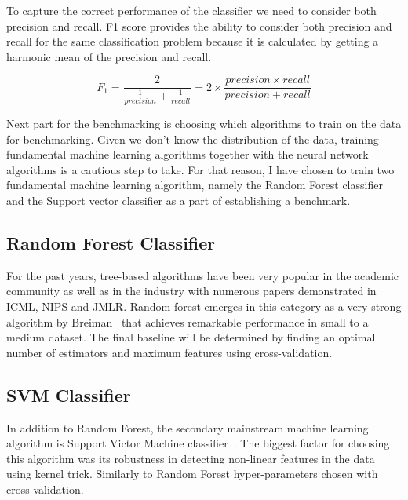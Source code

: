 To capture the correct performance of the classifier we need to consider both precision and recall.
F1 score provides the ability to consider both precision and recall for the same classification problem because it is calculated by getting a harmonic mean of the precision and recall.

\begin{equation}
    F_1 = \frac{2}{\frac{1}{precision} + \frac{1}{recall}} = 2 \times \frac{precision \times recall}{precision + recall}
\end{equation}


Next part for the benchmarking is choosing which algorithms to train on the data for benchmarking.
Given we don't know the distribution of the data, training fundamental machine learning algorithms together with the neural network algorithms is a cautious step to take. 
For that reason, I have chosen to train two fundamental machine learning algorithm, namely the Random Forest classifier and the Support vector classifier as a part of establishing a benchmark.


\subsection{Random Forest Classifier}
For the past years, tree-based algorithms have been very popular in the academic community as well as in the industry with numerous papers demonstrated in ICML, NIPS and JMLR.
Random forest emerges in this category as a very strong algorithm by Breiman~\cite{randomforest} that achieves remarkable performance in small to a medium dataset.
The final baseline will be determined by finding an optimal number of estimators and maximum features using cross-validation.


\subsection{SVM Classifier}
In addition to Random Forest, the secondary mainstream machine learning algorithm is Support Victor Machine classifier~\cite{svm}.
The biggest factor for choosing this algorithm was its robustness in detecting non-linear features in the data using kernel trick.
Similarly to Random Forest hyper-parameters chosen with cross-validation.

